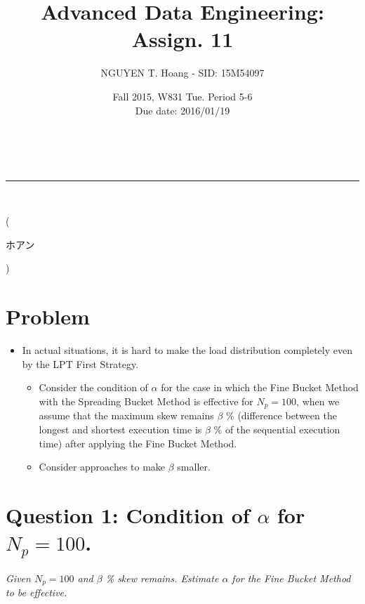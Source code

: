 \documentclass[a4paper,12pt]{article}
\makeatletter
\newcommand{\linia}{\rule{\linewidth}{0.5pt}}
\renewcommand{\maketitle} {
\begin{center}
\vspace{2ex}
{\LARGE \textsc{\@title}}
\vspace{1ex}
\\
\linia\\
\@author \hfill \@date
\vspace{4ex}
\end{center}
}
\makeatother
\begin{document}
\title{Advanced Data Engineering: Assign. 11}

\author{NGUYEN T. Hoang - SID: 15M54097}

\date{Fall 2015, W831 Tue. Period 5-6 \\ \hfill Due date: 2016/01/19}

\maketitle
\vspace{-4.5em}
\hspace{5.3em} (\begin{CJK}{UTF8}{min}ホアン\end{CJK})
\vspace{4em}
\section*{Problem}
\begin{itemize}
	\item In actual situations, it is hard to make the load distribution completely even by the LPT First Strategy.
\begin{itemize}
	\setlength{\parskip}{0cm}
	\setlength{\itemsep}{0cm}
	\item Consider the condition of $\alpha$ for the case in which the Fine Bucket Method with the Spreading Bucket Method is effective for $N_p = 100$, when we assume that the maximum skew remains $\beta$ \% (difference between the longest and shortest execution time is $\beta$ \% of the sequential execution time) after applying the Fine Bucket Method. 
	\item Consider approaches to make $\beta$ smaller.
\end{itemize}
\end{itemize}
\section*{Question 1: Condition of $\alpha$ for $N_p = 100$.}
\setcounter{section}{1}

\textit{Given $N_p = 100$ and $\beta$ \% skew remains. Estimate $\alpha$ for the Fine Bucket Method to be effective.} 
\end{document}
